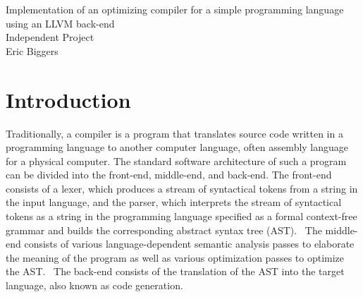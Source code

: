 \documentclass[11pt]{article}
\begin{document}
\begin{center}
{\LARGE Implementation of an optimizing compiler for a simple programming
language using an LLVM back-end} \\
\vspace{8mm}
{\Large Independent Project} \\
\vspace{4mm}
{\large Eric Biggers}
\end{center}
\vspace{5mm}

\begin{abstract}
    Designing a retargetable optimizing compiler is a very difficult task.
    Modern optimizing compilers such as GCC are extremely complex pieces of
    software that support hundreds of different optimizations and many different
    target architectures.  In contrast to the GCC project, the LLVM project
    attempts to encapsulate its compiler infrastructure in libraries that can be
    reused by external programs.  Here I present a compiler for a toy
    programming language called ``garter'' which takes advantage of the LLVM
    infrastructure to implement an optimizing compiler which performs
    state-of-the-art optimizations on the generated code.  I also present an
    interpreter for garter that uses LLVM to perform just-in-time (JIT)
    compilation.  In addition to showing the usefulness of LLVM, this project
    serves as a demonstration of the construction of a compiler front-end.
\end{abstract}

\tableofcontents

\section{Introduction}

Traditionally, a compiler is a program that translates source code written in a
programming language to another computer language, often assembly language for a
physical computer.  The standard software architecture of such a program can be
divided into the front-end, middle-end, and back-end.  The front-end consists of
a lexer, which produces a stream of syntactical tokens from a string in the
input language, and the parser, which interprets the stream of syntactical
tokens as a string in the programming language specified as a formal
context-free grammar and builds the corresponding abstract syntax tree (AST). \
The middle-end consists of various language-dependent semantic analysis passes
to elaborate the meaning of the program as well as various optimization passes
to optimize the AST. \ The back-end consists of the translation of the AST into
the target language, also known as code generation.
\end{document}
